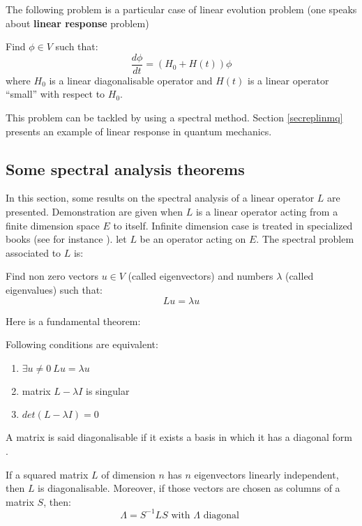 \documentclass[12pt]{book}
\begin{document}
The following problem is a particular case of linear evolution problem
 (one speaks about {\bf linear response} problem) 
\begin{prob} 
Find $\phi\in V$ such that:
\begin{equation}
\frac{d\phi}{dt}=(H_0+H(t))\phi
\end{equation}
where $H_0$ is a linear diagonalisable operator and $H(t)$ is a linear
operator ``small'' with respect to $H_0$.
\end{prob}
This problem can be tackled by using a spectral method. Section
\ref{secreplinmq} presents an example of linear response in quantum mechanics.


\subsection{Some spectral analysis theorems}
In this section, some results on the spectral analysis of a linear operator
$L$ are presented. Demonstration are given when $L$ is a linear operator
acting from a finite dimension space $E$ to itself. Infinite dimension case is
treated in specialized books (see for instance \cite{ma:equad:Dautray5}). 
let $L$ be an operator acting on $E$.
The spectral problem associated to $L$ is:
\begin{prob}
Find non zero vectors $u\in V$ (called eigenvectors) and numbers $\lambda$
(called eigenvalues) such that: 
\begin{equation}
Lu=\lambda u
\end{equation}
\end{prob}
Here is a fundamental theorem:
\begin{thm}
Following conditions are equivalent:
\begin{enumerate}
\item $\exists u \neq 0 \: Lu=\lambda u$
\item matrix  $L-\lambda I$ is singular
\item $det(L-\lambda I)=0$
\end{enumerate}
\end{thm}
A matrix is said diagonalisable if it exists a basis in which it has a
diagonal form \cite{ma:algeb:Strang76}.
\begin{thm}
If a squared matrix $L$ of dimension $n$ has $n$ eigenvectors linearly
independent, then $L$ is diagonalisable. Moreover, if those vectors are chosen
as columns of a matrix $S$, then:
\begin{equation}
\Lambda = S^{-1} L S \mbox{  with  } \Lambda \mbox{  diagonal  }
\end{equation}
\end{thm}
\end{document}
